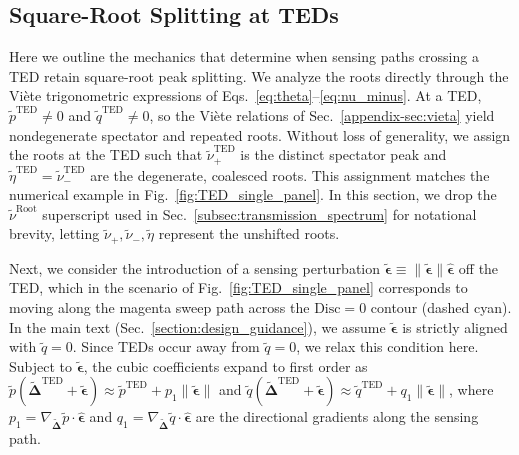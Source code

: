 \documentclass[%
  reprint,
  amsmath,amssymb,
  aps,
  prapplied,
  superscriptaddress,
  longbibliography]{revtex4-2}
\begin{document}
\subsection{\label{appendix-subsec:TED_str}Square-Root Splitting at TEDs}

Here we outline the mechanics that determine when sensing paths crossing a TED retain square-root peak splitting. We analyze the roots directly through the Viète trigonometric expressions of Eqs.~\ref{eq:theta}--\ref{eq:nu_minus}. At a TED, $\tilde{p}^\text{TED} \neq 0$ and $\tilde{q}^\text{TED} \neq 0$, so the Viète relations of Sec.~\ref{appendix-sec:vieta} yield nondegenerate spectator and repeated roots. Without loss of generality, we assign the roots at the TED such that $\tilde{\nu}_+^\text{TED}$ is the distinct spectator peak and $\tilde{\eta}^\text{TED} = \tilde{\nu}_-^\text{TED}$ are the degenerate, coalesced roots. This assignment matches the numerical example in Fig.~\ref{fig:TED_single_panel}. In this section, we drop the $\tilde{\nu}^\text{Root}$ superscript used in Sec.~\ref{subsec:transmission_spectrum} for notational brevity, letting $\tilde{\nu}_+, \tilde{\nu}_-, \tilde{\eta}$ represent the unshifted roots.

Next, we consider the introduction of a sensing perturbation $\boldsymbol{\tilde{\epsilon}} \equiv \lVert \boldsymbol{\tilde{\epsilon}} \rVert \boldsymbol{\hat{\epsilon}}$ off the TED, which in the scenario of Fig.~\ref{fig:TED_single_panel} corresponds to moving along the magenta sweep path across the $\mathrm{Disc} = 0$ contour (dashed cyan). In the main text (Sec.~\ref{section:design_guidance}), we assume $\boldsymbol{\tilde{\epsilon}}$ is strictly aligned with $\tilde{q} = 0$. Since TEDs occur away from $\tilde{q} = 0$, we relax this condition here. Subject to $\boldsymbol{\tilde{\epsilon}}$, the cubic coefficients expand to first order as $\tilde{p}(\boldsymbol{\tilde{\Delta}}^\text{TED} + \boldsymbol{\tilde{\epsilon}}) \approx \tilde{p}^\text{TED} + p_1 \lVert \boldsymbol{\tilde{\epsilon}} \rVert$ and $\tilde{q}(\boldsymbol{\tilde{\Delta}}^\text{TED} + \boldsymbol{\tilde{\epsilon}}) \approx \tilde{q}^\text{TED} + q_1 \lVert \boldsymbol{\tilde{\epsilon}} \rVert$, where $p_1 = \nabla_{\boldsymbol{\tilde{\Delta}}} \tilde{p} \cdot \boldsymbol{\hat{\epsilon}}$ and $q_1 = \nabla_{\boldsymbol{\tilde{\Delta}}} \tilde{q} \cdot \boldsymbol{\hat{\epsilon}}$ are the directional gradients along the sensing path.
\end{document}

